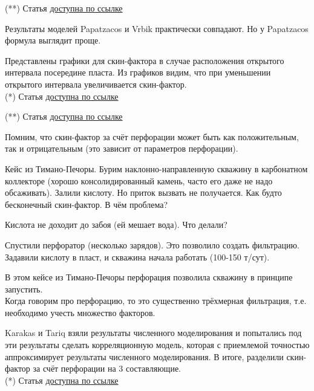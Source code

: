 \documentclass[main.tex]{subfiles}
\begin{document}
(**) Статья \href{https://mualal.github.io/source/tex/hydrocarbons2022/articles/vrbik1991.pdf}{доступна по ссылке}


Результаты моделей Papatzacos и Vrbik практически совпадают. Но у Papatzacos формула выглядит проще.

Представлены графики для скин-фактора в случае расположения открытого интервала посередине пласта. Из графиков видим, что при уменьшении открытого интервала увеличивается скин-фактор.\\

(*) Статья \href{https://mualal.github.io/source/tex/hydrocarbons2022/articles/papatzacos1987.pdf}{доступна по ссылке}

(**) Статья \href{https://mualal.github.io/source/tex/hydrocarbons2022/articles/vrbik1991.pdf}{доступна по ссылке}


Помним, что скин-фактор за счёт перфорации может быть как положительным, так и отрицательным (это зависит от параметров перфорации).

Кейс из Тимано-Печоры. Бурим наклонно-направленную скважину в карбонатном коллекторе (хорошо консолидированный камень, часто его даже не надо обсаживать). Залили кислоту. Но приток вызвать не получается. Как будто бесконечный скин-фактор. В чём проблема?

Кислота не доходит до забоя (ей мешает вода). Что делали?

Спустили перфоратор (несколько зарядов). Это позволило создать фильтрацию. Задавили кислоту в пласт, и скважина начала работать (100-150 т/сут).

В этом кейсе из Тимано-Печоры перфорация позволила скважину в принципе запустить.\\

Когда говорим про перфорацию, то это существенно трёхмерная фильтрация, т.е. необходимо учесть множество факторов.

Karakas и Tariq взяли результаты численного моделирования и попытались под эти результаты сделать корреляционную модель, которая с приемлемой точностью аппроксимирует результаты численного моделирования. В итоге, разделили скин-фактор за счёт перфорации на 3 составляющие.\\

(*) Статья \href{https://mualal.github.io/source/tex/hydrocarbons2022/articles/karakas1991.pdf}{доступна по ссылке}
\end{document}
